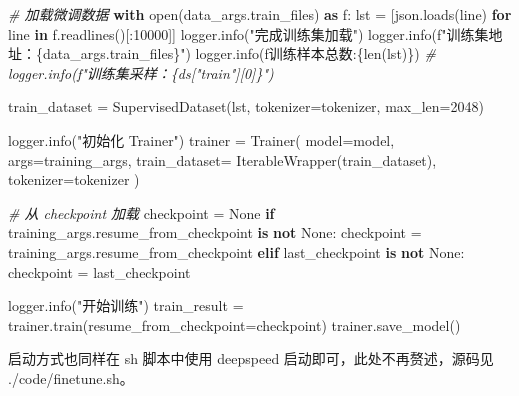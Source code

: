 \documentclass[
]{article}
\newenvironment{Shaded}{}{}
\newcommand{\BuiltInTok}[1]{\textcolor[rgb]{0.00,0.50,0.00}{#1}}
\newcommand{\CommentTok}[1]{\textcolor[rgb]{0.38,0.63,0.69}{\textit{#1}}}
\newcommand{\ControlFlowTok}[1]{\textcolor[rgb]{0.00,0.44,0.13}{\textbf{#1}}}
\newcommand{\DecValTok}[1]{\textcolor[rgb]{0.25,0.63,0.44}{#1}}
\newcommand{\ImportTok}[1]{\textcolor[rgb]{0.00,0.50,0.00}{\textbf{#1}}}
\newcommand{\KeywordTok}[1]{\textcolor[rgb]{0.00,0.44,0.13}{\textbf{#1}}}
\newcommand{\NormalTok}[1]{#1}
\newcommand{\OperatorTok}[1]{\textcolor[rgb]{0.40,0.40,0.40}{#1}}
\newcommand{\SpecialCharTok}[1]{\textcolor[rgb]{0.25,0.44,0.63}{#1}}
\newcommand{\SpecialStringTok}[1]{\textcolor[rgb]{0.73,0.40,0.53}{#1}}
\newcommand{\StringTok}[1]{\textcolor[rgb]{0.25,0.44,0.63}{#1}}
\newcommand{\VariableTok}[1]{\textcolor[rgb]{0.10,0.09,0.49}{#1}}
\begin{document}
\begin{Shaded}
\begin{Highlighting}[]
\CommentTok{\# 加载微调数据}
\ControlFlowTok{with} \BuiltInTok{open}\NormalTok{(data\_args.train\_files) }\ImportTok{as}\NormalTok{ f:}
\NormalTok{    lst }\OperatorTok{=}\NormalTok{ [json.loads(line) }\ControlFlowTok{for}\NormalTok{ line }\KeywordTok{in}\NormalTok{ f.readlines()[:}\DecValTok{10000}\NormalTok{]]}
\NormalTok{logger.info(}\StringTok{"完成训练集加载"}\NormalTok{)}
\NormalTok{logger.info(}\SpecialStringTok{f"训练集地址：}\SpecialCharTok{\{}\NormalTok{data\_args}\SpecialCharTok{.}\NormalTok{train\_files}\SpecialCharTok{\}}\SpecialStringTok{"}\NormalTok{)}
\NormalTok{logger.info(}\SpecialStringTok{f\textquotesingle{}训练样本总数:}\SpecialCharTok{\{}\BuiltInTok{len}\NormalTok{(lst)}\SpecialCharTok{\}}\SpecialStringTok{\textquotesingle{}}\NormalTok{)}
\CommentTok{\# logger.info(f"训练集采样：\{ds["train"][0]\}")}

\NormalTok{train\_dataset }\OperatorTok{=}\NormalTok{ SupervisedDataset(lst, tokenizer}\OperatorTok{=}\NormalTok{tokenizer, max\_len}\OperatorTok{=}\DecValTok{2048}\NormalTok{)}

\NormalTok{logger.info(}\StringTok{"初始化 Trainer"}\NormalTok{)}
\NormalTok{trainer }\OperatorTok{=}\NormalTok{ Trainer(}
\NormalTok{    model}\OperatorTok{=}\NormalTok{model,}
\NormalTok{    args}\OperatorTok{=}\NormalTok{training\_args,}
\NormalTok{    train\_dataset}\OperatorTok{=}\NormalTok{ IterableWrapper(train\_dataset),}
\NormalTok{    tokenizer}\OperatorTok{=}\NormalTok{tokenizer}
\NormalTok{)}

\CommentTok{\# 从 checkpoint 加载}
\NormalTok{checkpoint }\OperatorTok{=} \VariableTok{None}
\ControlFlowTok{if}\NormalTok{ training\_args.resume\_from\_checkpoint }\KeywordTok{is} \KeywordTok{not} \VariableTok{None}\NormalTok{:}
\NormalTok{    checkpoint }\OperatorTok{=}\NormalTok{ training\_args.resume\_from\_checkpoint}
\ControlFlowTok{elif}\NormalTok{ last\_checkpoint }\KeywordTok{is} \KeywordTok{not} \VariableTok{None}\NormalTok{:}
\NormalTok{        checkpoint }\OperatorTok{=}\NormalTok{ last\_checkpoint}

\NormalTok{logger.info(}\StringTok{"开始训练"}\NormalTok{)}
\NormalTok{train\_result }\OperatorTok{=}\NormalTok{ trainer.train(resume\_from\_checkpoint}\OperatorTok{=}\NormalTok{checkpoint)}
\NormalTok{trainer.save\_model() }
\end{Highlighting}
\end{Shaded}

启动方式也同样在 sh 脚本中使用 deepspeed 启动即可，此处不再赘述，源码见
./code/finetune.sh。
\end{document}
